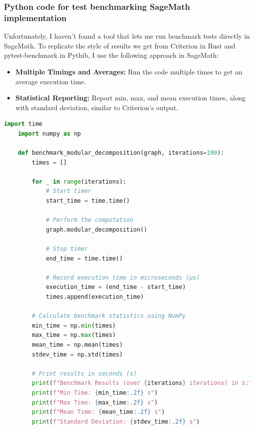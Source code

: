 

\subsubsection{Python code for test benchmarking SageMath implementation}

Unfortunately, I haven't found a tool that lets me run benchmark tests directly in SageMath.
To replicate the style of results we get from Criterion in Rust and pytest-benchmark in Pythib, I use the following approach in SageMath:
\begin{itemize}
    \item \textbf{Multiple Timings and Averages:} Run the code multiple times to get an average execution time.
    \item \textbf{Statistical Reporting:} Report min, max, and mean execution times, along with standard deviation, similar to Criterion’s output.
\end{itemize}

\begin{myex}

\end{myex}

\begin{lstlisting}[language=Python, style=python, caption={Example of benchmark code for modular decomposition}, label={lst:sagemath-example-of-benchmark-code}, firstnumber=1]
    import time
    import numpy as np

    def benchmark_modular_decomposition(graph, iterations=100):
        times = []

        for _ in range(iterations):
            # Start timer
            start_time = time.time()

            # Perform the computation
            graph.modular_decomposition()

            # Stop timer
            end_time = time.time()

            # Record execution time in microseconds (µs)
            execution_time = (end_time - start_time)
            times.append(execution_time)

        # Calculate benchmark statistics using NumPy
        min_time = np.min(times)
        max_time = np.max(times)
        mean_time = np.mean(times)
        stdev_time = np.std(times)

        # Print results in seconds (s)
        print(f"Benchmark Results (over {iterations} iterations) in s:")
        print(f"Min Time: {min_time:.2f} s")
        print(f"Max Time: {max_time:.2f} s")
        print(f"Mean Time: {mean_time:.2f} s")
        print(f"Standard Deviation: {stdev_time:.2f} s")
\end{lstlisting}


